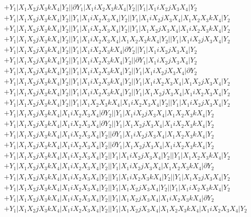 \documentclass{article}[12pt]
\begin{document}
\begin{align*}
 & +Y_1|X_1X_2jX_3kX_4|Y_2||\partial Y_1|X_1iX_2X_3kX_4|Y_2||Y_1|X_1iX_2jX_3X_4|Y_2\\ 
 & +Y_1|X_1X_2jX_3kX_4|Y_2||Y_1|X_1iX_2X_3X_4|Y_2||Y_1|X_1iX_2jX_3X_4|X_1X_2X_3kX_4|Y_2\\ 
 & +Y_1|X_1X_2jX_3kX_4|Y_2||Y_1|X_1iX_2X_3X_4|Y_2||Y_1|X_1X_2jX_3X_4|X_1iX_2X_3kX_4|Y_2\\ 
 & +Y_1|X_1X_2jX_3kX_4|Y_2||Y_1|X_1iX_2X_3X_4|X_1X_2X_3kX_4|Y_2||Y_1|X_1iX_2jX_3X_4|Y_2\\ 
 & +Y_1|X_1X_2jX_3kX_4|Y_2||Y_1|X_1iX_2X_3kX_4|\partial Y_2||Y_1|X_1iX_2jX_3X_4|Y_2\\ 
 & +Y_1|X_1X_2jX_3kX_4|Y_2||Y_1|X_1iX_2X_3kX_4|Y_2||\partial Y_1|X_1iX_2jX_3X_4|Y_2\\ 
 & +Y_1|X_1X_2jX_3kX_4|Y_2||Y_1|X_1iX_2X_3kX_4|Y_2||Y_1|X_1iX_2jX_3X_4|\partial Y_2\\ 
 & +Y_1|X_1X_2jX_3kX_4|Y_2||Y_1|X_1iX_2X_3kX_4|Y_2||Y_1|X_1iX_2X_3X_4|X_1X_2jX_3X_4|Y_2\\ 
 & +Y_1|X_1X_2jX_3kX_4|Y_2||Y_1|X_1iX_2X_3kX_4|Y_2||Y_1|X_1X_2jX_3X_4|X_1iX_2X_3X_4|Y_2\\ 
 & +Y_1|X_1X_2jX_3kX_4|Y_2||Y_1|X_1X_2X_3kX_4|X_1iX_2X_3X_4|Y_2||Y_1|X_1iX_2jX_3X_4|Y_2\\ 
 & +Y_1|X_1X_2jX_3kX_4|X_1iX_2X_3X_4|\partial Y_2||Y_1|X_1iX_2jX_3X_4|X_1X_2X_3kX_4|Y_2\\ 
 & +Y_1|X_1X_2jX_3kX_4|X_1iX_2X_3X_4|\partial Y_2||Y_1|X_1X_2jX_3X_4|X_1iX_2X_3kX_4|Y_2\\ 
 & +Y_1|X_1X_2jX_3kX_4|X_1iX_2X_3X_4|Y_2||\partial Y_1|X_1iX_2jX_3X_4|X_1X_2X_3kX_4|Y_2\\ 
 & +Y_1|X_1X_2jX_3kX_4|X_1iX_2X_3X_4|Y_2||\partial Y_1|X_1X_2jX_3X_4|X_1iX_2X_3kX_4|Y_2\\ 
 & +Y_1|X_1X_2jX_3kX_4|X_1iX_2X_3X_4|Y_2||Y_1|X_1iX_2jX_3X_4|Y_2||Y_1|X_1X_2X_3kX_4|Y_2\\ 
 & +Y_1|X_1X_2jX_3kX_4|X_1iX_2X_3X_4|Y_2||Y_1|X_1iX_2jX_3X_4|X_1X_2X_3kX_4|\partial Y_2\\ 
 & +Y_1|X_1X_2jX_3kX_4|X_1iX_2X_3X_4|Y_2||Y_1|X_1iX_2X_3kX_4|Y_2||Y_1|X_1X_2jX_3X_4|Y_2\\ 
 & +Y_1|X_1X_2jX_3kX_4|X_1iX_2X_3X_4|Y_2||Y_1|X_1X_2jX_3X_4|Y_2||Y_1|X_1iX_2X_3kX_4|Y_2\\ 
 & +Y_1|X_1X_2jX_3kX_4|X_1iX_2X_3X_4|Y_2||Y_1|X_1X_2jX_3X_4|X_1iX_2X_3kX_4|\partial Y_2\\ 
 & +Y_1|X_1X_2jX_3kX_4|X_1iX_2X_3X_4|Y_2||Y_1|X_1X_2jX_3X_4|X_1X_2X_3kX_4|X_1iX_2X_3X_4|Y_2\\ 

\end{align*}
\end{document}
